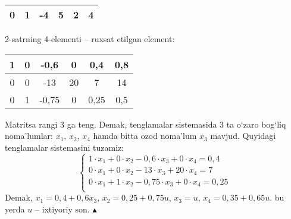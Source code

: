 \begin{enumerate}
\begin{center}
\begin{tabular}{|c|c|c|c|c|c|}
		0&1&-4&5&2&4\\ \hline
	\end{tabular}
\end{center}
2-satrning 4-elementi -- ruxsat etilgan element:
\begin{center}
	\begin{tabular}{|c|c|c|c|c|c|}
		\hline
	1&0&-0,6&0&0,4&0,8\\ \hline
	0&0&-13&20&7&14\\ \hline
	0&1&-0,75&0&0,25&0,5\\ \hline	
	\end{tabular}
\end{center}
Matritsa rangi  3 ga teng. Demak, tenglamalar sistemasida 3 ta  o`zaro bog`liq noma'lumlar: $x_{1}$, $x_{2}$, $x_{4}$ hamda bitta ozod noma'lum $x_{3}$  mavjud. Quyidagi tenglamalar sistemasini tuzamiz:
$$\begin{cases}
	1\cdot x_{1}+0\cdot x_{2}-0,6\cdot x_{3}+0\cdot x_{4}=0,4\\
	0\cdot x_{1}+0\cdot x_{2}-13\cdot x_{3}+20\cdot x_{4}=7\\ 
	0\cdot x_{1}+1\cdot x_{2}-0,75\cdot x_{3}+0\cdot x_{4}=0,25\\
\end{cases}$$
Demak, $x_{1}=0,4+0,6x_{3}$, $x_{2}=0,25+0,75u$, $x_{3}=u$, $x_{4}=0,35+0,65u$.
bu  yerda $u$ -- ixtiyoriy son. $\blacktriangle$


\end{enumerate}
